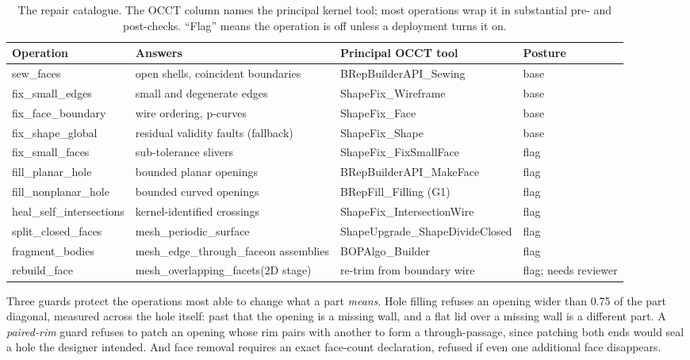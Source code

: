 \documentclass[10pt,onecolumn]{article}
\newcommand{\code}[1]{\texttt{\small #1}}
\newcommand{\tablecode}{\renewcommand{\code}[1]{{\fontsize{7.2}{8.6}\selectfont\ttfamily ##1}}}
\begin{document}
\begin{table}[h]
\centering
\caption{The repair catalogue. The OCCT column names the principal kernel tool; most operations wrap
it in substantial pre- and post-checks. ``Flag'' means the operation is off unless a deployment
turns it on.}
\label{tab:ops}
\footnotesize\tablecode
\begin{tabularx}{\textwidth}{@{}L{34mm} L{33mm} X L{15mm}@{}}
\toprule
\textbf{Operation} & \textbf{Answers} & \textbf{Principal OCCT tool} & \textbf{Posture}\\
\midrule
\code{sew\_faces}               & open shells, coincident boundaries & \code{BRepBuilderAPI\_Sewing} & base\\
\code{fix\_small\_edges}        & small and degenerate edges         & \code{ShapeFix\_Wireframe}    & base\\
\code{fix\_face\_boundary}      & wire ordering, p-curves            & \code{ShapeFix\_Face}         & base\\
\code{fix\_shape\_global}       & residual validity faults (fallback)& \code{ShapeFix\_Shape}        & base\\
\code{fix\_small\_faces}        & sub-tolerance slivers              & \code{ShapeFix\_FixSmallFace} & flag\\
\code{fill\_planar\_hole}       & bounded planar openings            & \code{BRepBuilderAPI\_MakeFace}& flag\\
\code{fill\_nonplanar\_hole}    & bounded curved openings            & \code{BRepFill\_Filling} (G1) & flag\\
\code{heal\_self\_intersections}& kernel-identified crossings        & \code{ShapeFix\_IntersectionWire}& flag\\
\code{split\_closed\_faces}     & \code{mesh\_periodic\_surface}     & \code{ShapeUpgrade\_Shape\-Divide\-Closed} & flag\\
\code{fragment\_bodies}         & \code{mesh\_edge\_through\_face}\newline on assemblies & \code{BOPAlgo\_Builder} & flag\\
\code{rebuild\_face}            & \code{mesh\_overlapping\_facets}\newline(2D stage) & re-trim from boundary wire & flag; needs reviewer\\
\bottomrule
\end{tabularx}
\end{table}

Three guards protect the operations most able to change what a part \emph{means}. Hole filling
refuses an opening wider than 0.75 of the part diagonal, measured across the hole itself: past that
the opening is a missing wall, and a flat lid over a missing wall is a different part. A
\emph{paired-rim} guard refuses to patch an opening whose rim pairs with another to form a
through-passage, since patching both ends would seal a hole the designer intended. And face removal
requires an exact face-count declaration, refused if even one additional face disappears.
\end{document}
